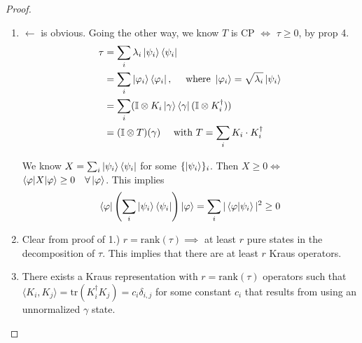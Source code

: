 \documentclass[10pt,oneside,longbibliography]{report}
\begin{document}
\begin{tcolorbox}[colframe=black,breakable, colback=black!5, arc=0pt, outer arc=0pt,boxrule=0.5pt]
\begin{proof}
\begin{enumerate}
    \item $\leftarrow$ is obvious. Going the other way, we know $T$ is CP $\Leftrightarrow$ $\tau \geq 0$, by prop 4. 
    \begin{align}
        \tau &=\sum_i \lambda_i \ket{\psi_i}\bra{\psi_i} \\
        &= \sum_i \ket{\varphi_i}\bra{\varphi_i}, \quad \text{ where } \ket{\varphi_i}=\sqrt{\lambda_i} \ket{\psi_i}\\
        &= \sum_i (\mathbb{I}\otimes K_i \ket{\gamma}\bra{\gamma} (\mathbb{I}\otimes K_i^{\dagger}))\\
        &=(\mathbb{I}\otimes T)(\gamma) \quad \text{ with } T= \sum_i K_i \cdot K_i^{\dagger}
    \end{align}
    
    We know $X=\sum_i \ket{\psi_i}\bra{\psi_i}$ for some $\{\ket{\psi_i}\}_i$. Then $X\geq 0 \Leftrightarrow$ $\braket{\varphi|X|\varphi} \geq 0 \quad \forall \ket{\varphi}$. This implies 
    \begin{align}
        \bra{\varphi}\left(\sum_i \ket{\psi_i}\bra{\psi_i}\right)\ket{\varphi} = \sum_i |\braket{\varphi|\psi_i}|^2 \geq 0
    \end{align}
    
    
    \item Clear from proof of 1.) $r=\text{rank}(\tau) \implies$ at least $r$ pure states in the decomposition of $\tau$. This implies that there are at least $r$ Kraus operators. 
    \item There exists a Kraus representation with $r=\text{rank}(\tau)$ operators such that $\langle K_i,K_j\rangle=\text{tr}(K_i^{\dagger} K_j) = c_i \delta_{i,j}$ for some constant $c_i$ that results from using an unnormalized $\gamma$ state. 
    

\end{enumerate}
\end{proof}
\end{tcolorbox}
\end{document}
